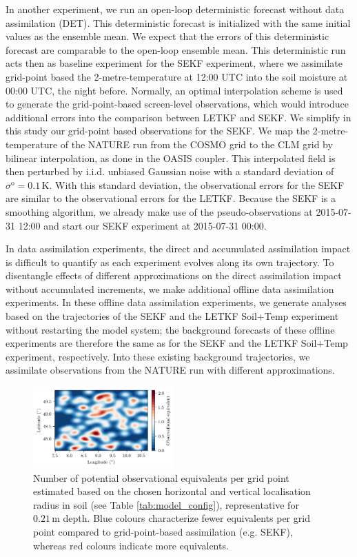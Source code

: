 \documentclass[hess, manuscript]{copernicus}
\begin{document}
In another experiment, we run an open-loop deterministic forecast without data assimilation (DET).
This deterministic forecast is initialized with the same initial values as the ensemble mean.
We expect that the errors of this deterministic forecast are comparable to the open-loop ensemble mean.
This deterministic run acts then as baseline experiment for the SEKF experiment, where we assimilate grid-point based the 2-metre-temperature at 12:00 UTC into the soil moisture at 00:00 UTC, the night before.
Normally, an optimal interpolation scheme is used to generate the grid-point-based screen-level observations, which would introduce additional errors into the comparison between LETKF and SEKF.
We simplify in this study our grid-point based observations for the SEKF.
We map the 2-metre-temperature of the NATURE run from the COSMO grid to the CLM grid by bilinear interpolation, as done in the OASIS coupler.
This interpolated field is then perturbed by i.i.d. unbiased Gaussian noise with a standard deviation of $\sigma^\text{o} = 0.1\,\text{K}$.
With this standard deviation, the observational errors for the SEKF are similar to the observational errors for the LETKF.
Because the SEKF is a smoothing algorithm, we already make use of the pseudo-observations at 2015-07-31 12:00 and start our SEKF experiment at 2015-07-31 00:00.

In data assimilation experiments, the direct and accumulated assimilation impact is difficult to quantify as each experiment evolves along its own trajectory.
To disentangle effects of different approximations on the direct assimilation impact without accumulated increments, we make additional offline data assimilation experiments.
In these offline data assimilation experiments, we generate analyses based on the trajectories of the SEKF and the LETKF Soil+Temp experiment without restarting the model system; the background forecasts of these offline experiments are therefore the same as for the SEKF and the LETKF Soil+Temp experiment, respectively.
Into these existing background trajectories, we assimilate observations from the NATURE run with different approximations.

\begin{figure}
	\includegraphics[width=0.48\textwidth]{figures/fig_01_obs_equivalent.png}
	\caption{
		Number of potential observational equivalents per grid point estimated based on the chosen horizontal and vertical localisation radius in soil (see Table \ref{tab:model_config}), representative for $0.21\,\text{m}$ depth.
		Blue colours characterize fewer equivalents per grid point compared to grid-point-based assimilation (e.g. SEKF), whereas red colours indicate more equivalents.
	}
	\label{fig:obs_equivalent}
\end{figure}
\end{document}
